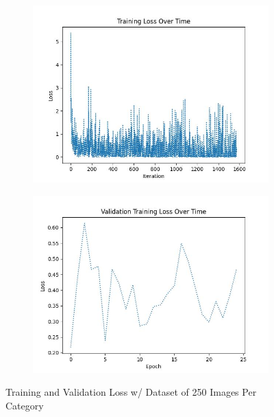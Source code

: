 \documentclass{article}
\begin{document}
\begin{figure}[H]
    \centering
    \begin{subfigure}{0.4\textwidth}
        \centering
        \includegraphics[width = \textwidth]{imgs/loss/loss_plot_250.jpg}
    \end{subfigure}
    \begin{subfigure}{0.4\textwidth}
        \centering
        \includegraphics[width = \textwidth]{imgs/loss/validation_loss_plot_250.jpg}
    \end{subfigure}
    \caption{Training and Validation Loss w/ Dataset of 250 Images Per Category}
\end{figure}
\end{document}
